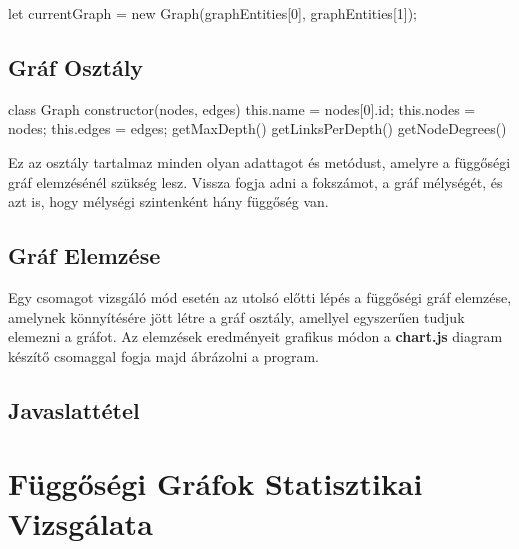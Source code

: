 \begin{cpp}
let currentGraph = new Graph(graphEntities[0], graphEntities[1]);
\end{cpp}

\pagebreak

\subsection{Gráf Osztály}

\begin{cpp}
class Graph{
	constructor(nodes, edges){
		this.name = nodes[0].id;
		this.nodes = nodes;
		this.edges = edges;
	}
	getMaxDepth(){
	}
	getLinksPerDepth(){
	}
	getNodeDegrees(){
	}	
}
\end{cpp}

Ez az osztály tartalmaz minden olyan adattagot és metódust, amelyre a függőségi gráf elemzésénél szükség lesz. Vissza fogja adni a fokszámot, a gráf mélységét, és azt is, hogy mélységi szintenként hány függőség van.

\subsection{Gráf Elemzése}

Egy csomagot vizsgáló mód esetén az utolsó előtti lépés a függőségi gráf elemzése, amelynek könnyítésére jött létre a gráf osztály, amellyel egyszerűen tudjuk elemezni a gráfot. Az elemzések eredményeit grafikus módon a \textbf{chart.js} diagram készítő csomaggal fogja majd ábrázolni a program.

\subsection{Javaslattétel}

\section{Függőségi Gráfok Statisztikai Vizsgálata}











